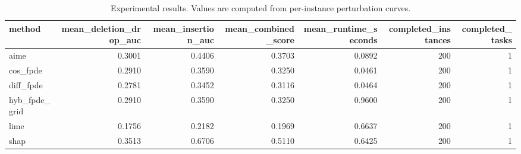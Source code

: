 \begin{table}[t]
\caption{Experimental results. Values are computed from per-instance perturbation curves.}
\label{tab:main_results_computed}
\centering
\begin{tabular}{lrrrrrr}
\toprule
method & mean\_deletion\_drop\_auc & mean\_insertion\_auc & mean\_combined\_score & mean\_runtime\_seconds & completed\_instances & completed\_tasks \\
\midrule
aime & 0.3001 & 0.4406 & 0.3703 & 0.0892 & 200 & 1 \\
cos\_fpde & 0.2910 & 0.3590 & 0.3250 & 0.0461 & 200 & 1 \\
diff\_fpde & 0.2781 & 0.3452 & 0.3116 & 0.0464 & 200 & 1 \\
hyb\_fpde\_grid & 0.2910 & 0.3590 & 0.3250 & 0.9600 & 200 & 1 \\
lime & 0.1756 & 0.2182 & 0.1969 & 0.6637 & 200 & 1 \\
shap & 0.3513 & 0.6706 & 0.5110 & 0.6425 & 200 & 1 \\
\bottomrule
\end{tabular}

\end{table}
